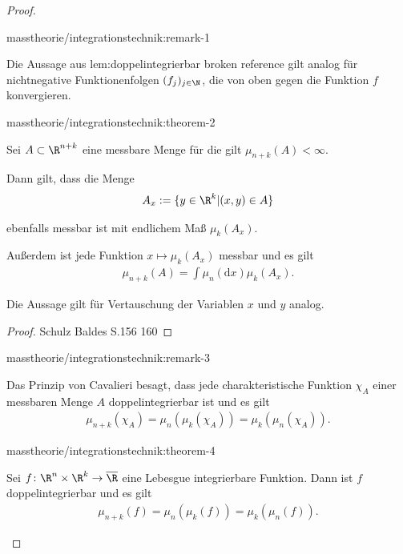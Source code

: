 \documentclass[letterpaper,10pt,english]{jupyterBook}
\begin{document}
\begin{proof}
\begin{remark}{}{masstheorie/integrationstechnik:remark-1}
\par
Die Aussage aus {lem:doppelintegrierbar broken reference} gilt analog für nichtnegative Funktionenfolgen \((f_j)_{j\in\N}\), die von oben gegen die Funktion \(f\) konvergieren.
\end{remark}
\begin{theorem}{}{masstheorie/integrationstechnik:theorem-2}



\par
Sei \(A \subset \R^{n+k}\) eine messbare Menge für die gilt \(\mu_{n+k}(A) < \infty\).

\par
Dann gilt, dass die Menge
\begin{align*}
A_x := \lbrace y \in \R^k | (x,y) \in A \rbrace
\end{align*}
\par
ebenfalls messbar ist mit endlichem Maß \(\mu_k(A_x)\).

\par
Außerdem ist jede Funktion \(x \mapsto \mu_k(A_x)\) messbar und es gilt
\begin{align*}
\mu_{n+k}(A) = \int \mu_n(\mathrm{d}x) \mu_k(A_x).
\end{align*}
\par
Die Aussage gilt für Vertauschung der Variablen \(x\) und \(y\) analog.
\end{theorem}

\begin{proof}
 Schulz Baldes S.156 160
\end{proof}
\begin{remark}{}{masstheorie/integrationstechnik:remark-3}



\par
Das Prinzip von Cavalieri besagt, dass jede charakteristische Funktion \(\chi_A\) einer messbaren Menge \(A\) doppelintegrierbar ist und es gilt
\begin{align*}
\mu_{n+k}(\chi_A) = \mu_n(\mu_k(\chi_A)) = \mu_k(\mu_n(\chi_A)).\end{align*}\end{remark}
\begin{theorem}{}{masstheorie/integrationstechnik:theorem-4}



\par
Sei \(f \colon \R^{n} \times \R^k \rightarrow \overline{\R}\) eine Lebesgue integrierbare Funktion.
Dann ist \(f\) doppelintegrierbar und es gilt
\begin{align*}
\mu_{n+k}(f) = \mu_n(\mu_k(f)) = \mu_k(\mu_n(f)).\end{align*}\end{theorem}


\end{proof}
\end{document}
